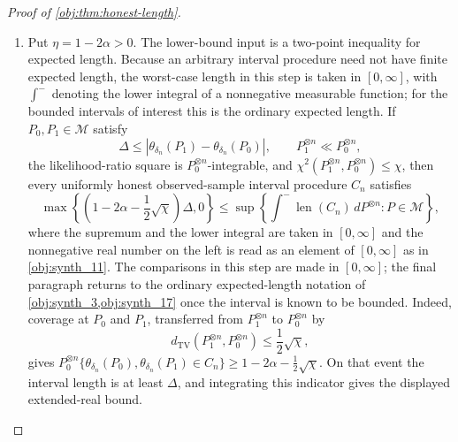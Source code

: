 \documentclass[11pt]{article}
\begin{document}
\begin{proof}[Proof of \cref{obj:thm:honest-length}]
\begin{enumerate}
\[\]
By \cref{obj:lem:bandwidth-balance}, for all sufficiently large \(n\),
\[
n h_n^{2\beta+1}(\delta_n+h_n)^\kappa=1,
\qquad
0<h_n,
\qquad
h_n\le1.
\]
The effective local sample size has the following lower bound. Put
\[
\gamma_{\mathrm{bal}}=2\beta+\kappa+1 .
\]
Since \(\delta_n\ge0\), \(h_n>0\), and \(\kappa\ge0\),
\[
h_n^{\gamma_{\mathrm{bal}}}
=h_n^{2\beta+1}h_n^\kappa
\le h_n^{2\beta+1}(\delta_n+h_n)^\kappa
=n^{-1}.
\]
Because \(\gamma_{\mathrm{bal}}>0\), this gives \(h_n\le n^{-1/\gamma_{\mathrm{bal}}}\). Multiplying the balance identity by \(h_n^{-2\beta}\) gives
\[
n h_n(\delta_n+h_n)^\kappa=h_n^{-2\beta},
\]
and therefore, since \(-2\beta<0\),
\[
n^{2\beta/(2\beta+\kappa+1)}
=\left(n^{-1/\gamma_{\mathrm{bal}}}\right)^{-2\beta}
\le h_n^{-2\beta}
=n h_n(\delta_n+h_n)^\kappa .
\]
Exponential decay along this polynomial scale is eventually bounded by \(n^{-1/2}\). Combining the
exponential-decay bound with the polynomial scale bound for \(n h_n(\delta_n+h_n)^\kappa\), and using
\(h_n^\beta\le1\), yields uniformly in \(P\in\mathcal M\) and \(x\in\mathcal X\),
\[
\mathbb E_{P^{\otimes n}}D_{n,x}
\le
C_{\mathrm{rad}}
\left(n^{-1/2}+\delta_n^{\kappa+1}h_n^\beta\right).
\]
Since \(J\) is fixed, summing over strata gives the displayed \(C_{\mathrm{up}}\) bound.

\item Put \(\eta=1-2\alpha>0\). The lower-bound input is a two-point inequality for expected length.  Because an arbitrary interval procedure need not have finite expected length, the worst-case length in this step is taken in \([0,\infty]\), with \(\int^{-}\) denoting the lower integral of a nonnegative measurable function; for the bounded intervals of interest this is the ordinary expected length.
If \(P_0,P_1\in\mathcal M\) satisfy
\[
\Delta\le |\theta_{\delta_n}(P_1)-\theta_{\delta_n}(P_0)|,
\qquad
P_1^{\otimes n}\ll P_0^{\otimes n},
\]
the likelihood-ratio square is \(P_0^{\otimes n}\)-integrable, and
\(\chi^2(P_1^{\otimes n},P_0^{\otimes n})\le\chi\), then every uniformly honest observed-sample
interval procedure \(C_n\) satisfies
\[
\max\!\left\{\left(1-2\alpha-\frac12\sqrt\chi\right)\Delta,0\right\}
\le
\sup\left\{
\int^{-}\operatorname{len}(C_n)\,dP^{\otimes n}: P\in\mathcal M
\right\},
\]
where the supremum and the lower integral are taken in \([0,\infty]\) and the nonnegative real number on the left is read as an element of \([0,\infty]\) as in \cref{obj:synth_11}. The comparisons in this step are made in \([0,\infty]\); the final paragraph returns to the ordinary expected-length notation of \cref{obj:synth_3,obj:synth_17} once the interval is known to be bounded. Indeed, coverage at \(P_0\) and
\(P_1\), transferred from \(P_1^{\otimes n}\) to \(P_0^{\otimes n}\) by
\[
d_{\mathrm{TV}}(P_1^{\otimes n},P_0^{\otimes n})
\le \frac12\sqrt{\chi},
\]
gives \(P_0^{\otimes n}\{\theta_{\delta_n}(P_0),\theta_{\delta_n}(P_1)\in C_n\}\ge
1-2\alpha-\frac12\sqrt\chi\). On that event the interval length is at least \(\Delta\), and integrating
this indicator gives the displayed extended-real bound.


\end{enumerate}
\end{proof}
\end{document}
